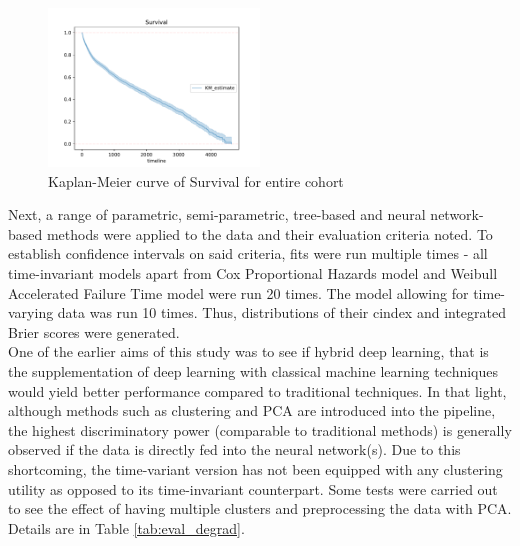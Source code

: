 \documentclass[%
 twocolumn,
 reprint,
 amsmath,amssymb,
 aps,nofootinbib
]{revtex4-2}
\begin{document}
\begin{figure}
  \centering
  \includegraphics[width=0.5\textwidth]{km_curve.pdf}
  \caption[KM curve]{Kaplan-Meier curve of Survival for entire cohort}
  \label{fig:km_curve}
\end{figure}

Next, a range of parametric, semi-parametric, tree-based and neural network-based methods were applied to the data and their evaluation criteria noted. To establish confidence intervals on said criteria, fits were run multiple times - all time-invariant models apart from Cox Proportional Hazards model and Weibull Accelerated Failure Time model were run 20 times. The model allowing for time-varying data was run 10 times. Thus, distributions of their cindex and integrated Brier scores were generated. \\

One of the earlier aims of this study was to see if hybrid deep learning, that is the supplementation of deep learning with classical machine learning techniques would yield better performance compared to traditional techniques. In that light, although methods such as clustering and PCA are introduced into the pipeline, the highest discriminatory power (comparable to traditional methods) is generally observed if the data is directly fed into the neural network(s). Due to this shortcoming, the time-variant version has not been equipped with any clustering utility as opposed to its time-invariant counterpart. Some tests were carried out to see the effect of having multiple clusters and preprocessing the data with PCA. Details are in Table \ref{tab:eval_degrad}.
\end{document}

